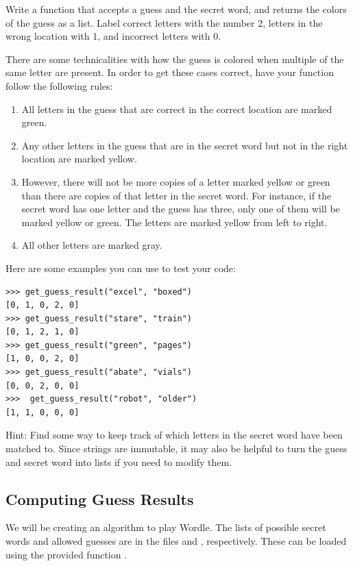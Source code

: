\begin{problem}
	Write a function  that accepts a guess and the secret word, and returns the colors of the guess as a list.
	Label correct letters with the number 2, letters in the wrong location with 1, and incorrect letters with 0.

There are some technicalities with how the guess is colored when multiple of the same letter are present.
In order to get these cases correct, have your function follow the following rules:
\begin{enumerate}
\item All letters in the guess that are correct in the correct location are marked green.
\item Any other letters in the guess that are in the secret word but not in the right location are marked yellow.
\item However, there will not be more copies of a letter marked yellow or green than there are copies of that letter in the secret word. 
For instance, if the secret word has one letter  and the guess has three, only one of them will be marked yellow or green.
The letters are marked yellow from left to right.
\item All other letters are marked gray.
\end{enumerate}
	
	Here are some examples you can use to test your code:
\begin{lstlisting}
>>> get_guess_result("excel", "boxed")
[0, 1, 0, 2, 0]
>>> get_guess_result("stare", "train")
[0, 1, 2, 1, 0]
>>> get_guess_result("green", "pages")
[1, 0, 0, 2, 0]
>>> get_guess_result("abate", "vials")
[0, 0, 2, 0, 0]
>>>  get_guess_result("robot", "older")
[1, 1, 0, 0, 0]
\end{lstlisting}
	
	Hint: Find some way to keep track of which letters in the secret word have been matched to.
	Since strings are immutable, it may also be helpful to turn the guess and secret word into lists if you need to modify them.
\end{problem}

\subsection*{Computing Guess Results}
We will be creating an algorithm to play Wordle.
The lists of possible secret words and allowed guesses are in the files  and , respectively.
These can be loaded using the provided function .

